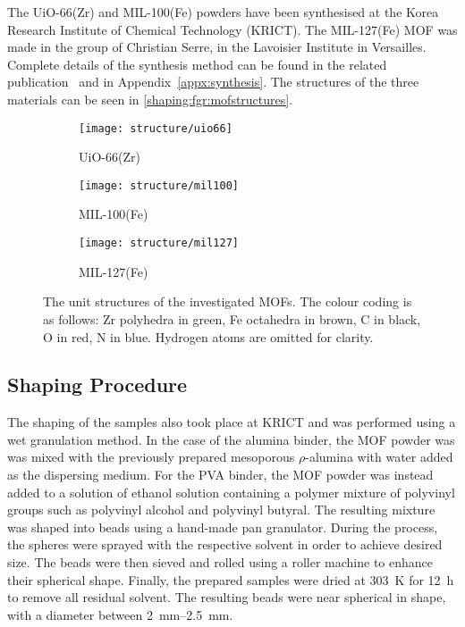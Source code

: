 The UiO-66(Zr) and MIL-100(Fe) powders have been synthesised at the
Korea Research Institute of Chemical Technology (KRICT).
The MIL-127(Fe) MOF was made in the group of Christian Serre,
in the Lavoisier Institute in Versailles.
Complete details of the synthesis method can be found in the related
publication~\cite{valekarShapingPorousMetal2017}
and in Appendix~\ref{appx:synthesis}.
The structures of the three materials can be seen
in \autoref{shaping:fgr:mofstructures}.

\begin{figure}[htb]
	\centering
	\begin{subfigure}[b]{0.3\textwidth}
		\texttt{[image: structure/uio66]}
		\caption{UiO-66(Zr)}
	\end{subfigure}%
	\begin{subfigure}[b]{0.3\textwidth}
		\texttt{[image: structure/mil100]}
		\caption{MIL-100(Fe)}
	\end{subfigure}%
	\begin{subfigure}[b]{0.3\textwidth}
		\texttt{[image: structure/mil127]}
		\caption{MIL-127(Fe)}
	\end{subfigure}%

	\caption{The unit structures of the investigated MOFs.
		The colour coding is as follows: Zr polyhedra in green,
		Fe octahedra in brown, C in black, O in red, N in blue.
		Hydrogen atoms are omitted for clarity.}%
	\label{shaping:fgr:mofstructures}
\end{figure}

\subsection{Shaping Procedure}

The shaping of the samples also took place at KRICT and was performed
using a wet granulation method. In the case of the alumina binder,
the MOF powder was was mixed with the previously prepared mesoporous
\(\rho\)-alumina with water added as the dispersing medium. For the
PVA binder, the MOF powder was instead added to a solution of
ethanol solution containing a polymer mixture of polyvinyl groups
such as polyvinyl alcohol and polyvinyl butyral. The resulting
mixture was shaped into beads using a hand-made pan granulator.
During the process, the spheres were sprayed with the respective
solvent in order to achieve desired size. The beads were then sieved
and rolled using a roller machine to enhance their spherical
shape. Finally, the prepared samples were dried at \SI{303}{\kelvin}
for \SI{12}{\hour} to remove all residual solvent.
The resulting beads were near spherical in shape, with a diameter
between \SIrange{2}{2.5}{\milli\metre}.

